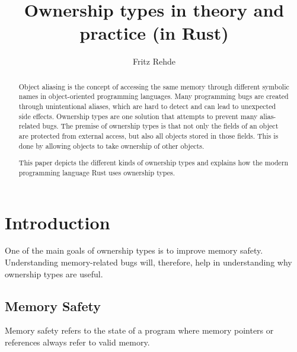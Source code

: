 \documentclass[sigplan,11pt,nonacm]{acmart}
\begin{document}
\title{Ownership types in theory and practice (in Rust)}
\author{Fritz Rehde}



\begin{abstract}

Object aliasing is the concept of accessing the same memory through different symbolic names in object-oriented programming languages.
Many programming bugs are created through unintentional aliases, which are hard to detect and can lead to unexpected side effects.
Ownership types are one solution that attempts to prevent many alias-related bugs.
The premise of ownership types is that not only the fields of an object are protected from external access, but also all objects stored in those fields.
This is done by allowing objects to take ownership of other objects.

This paper depicts the different kinds of ownership types and explains how the modern programming language Rust uses ownership types.

\end{abstract}


\maketitle


\section{Introduction}
\label{sec:introduction}

One of the main goals of ownership types is to improve memory safety.
Understanding memory-related bugs will, therefore, help in understanding why ownership types are useful.


\subsection{Memory Safety}
\label{sec:memory-safety}

Memory safety refers to the state of a program where memory pointers or references always refer to valid memory.
\end{document}
